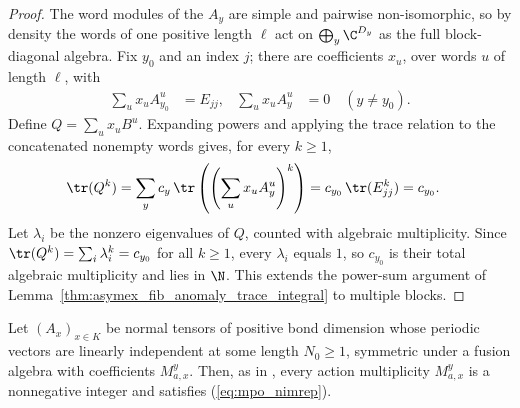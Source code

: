 \begin{proof}
    \leanok
    The word modules of the $A_y$ are simple and pairwise non-isomorphic, so
    by density the words of one positive length $\ell$ act on
    $\bigoplus_y\C^{D_y}$ as the full block-diagonal algebra. Fix $y_0$ and an
    index $j$; there are coefficients $x_u$, over words $u$ of length $\ell$,
    with
    \begin{align}
        \sum_ux_uA_{y_0}^u & =E_{jj},            &
        \sum_ux_uA_y^u     & =0\quad(y\neq y_0).
        \label{eq:mpoalg_trace_integral_unit}
    \end{align}
    Define $Q=\sum_ux_uB^u$. Expanding powers and applying the trace
    relation to the concatenated nonempty words gives, for every $k\geq1$,
    \begin{align}
        \tr(Q^k)
         & =\sum_yc_y\,\tr\left(\left(\sum_ux_uA_y^u\right)^k\right)
        =c_{y_0}\,\tr(E_{jj}^k)=c_{y_0}.
        \label{eq:mpoalg_trace_integral_powers}
    \end{align}
    Let $\lambda_i$ be the nonzero eigenvalues of $Q$, counted with algebraic
    multiplicity. Since $\tr(Q^k) = \sum_i \lambda_i^k = c_{y_0}$ for all
    $k\geq1$, every $\lambda_i$ equals $1$, so $c_{y_0}$ is their total
    algebraic multiplicity and lies in $\N$. This extends the power-sum argument of
    Lemma~\ref{thm:asymex_fib_anomaly_trace_integral} to multiple blocks.
\end{proof}

\begin{theorem}%
    \label{thm:mpo_symmetric_nimrep}
    \leanok
    Let $(A_x)_{x\in K}$ be normal tensors of positive bond dimension whose
    periodic vectors are linearly independent at some length $N_0\geq1$,
    symmetric under a fusion algebra with coefficients $M_{a,x}^y$. Then, as
    in \cite[Section~3]{GarreRubio2023MPOSym}, every action multiplicity
    $M_{a,x}^y$ is a nonnegative integer and satisfies (\ref{eq:mpo_nimrep}).
\end{theorem}

